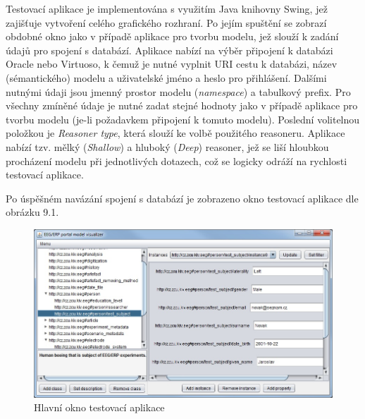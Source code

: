 \documentclass{projekt}
\begin{document}
Testovací aplikace je implementována s využitím Java knihovny Swing, jež zajišťuje vytvoření celého grafického rozhraní. Po jejím spuštění se zobrazí obdobné okno jako v případě aplikace pro tvorbu modelu, jež slouží k zadání údajů pro spojení s databází. Aplikace nabízí na výběr připojení k databázi Oracle nebo Virtuoso, k čemuž je nutné vyplnit URI cestu k databázi, název (sémantického) modelu a uživatelské jméno a heslo pro přihlášení. Dalšími nutnými údaji jsou jmenný prostor modelu ({\it namespace}) a tabulkový prefix. Pro všechny zmíněné údaje je nutné zadat stejné hodnoty jako v případě aplikace pro tvorbu modelu (je-li požadavkem připojení k tomuto modelu). Poslední volitelnou položkou je {\it Reasoner type}, která slouží ke volbě použitého reasoneru. Aplikace nabízí tzv. mělký ({\it Shallow}) a hluboký ({\it Deep}) reasoner, jež se liší hloubkou procházení modelu při jednotlivých dotazech, což se logicky odráží na rychlosti testovací aplikace.

Po úspěšném navázání spojení s databází je zobrazeno okno testovací aplikace dle obrázku 9.1.


\begin{figure}[htb]
\begin{center}
\includegraphics[scale=0.60]{mainFrame.jpg}
\caption{Hlavní okno testovací aplikace}
\end{center}
\end{figure}
\end{document}
